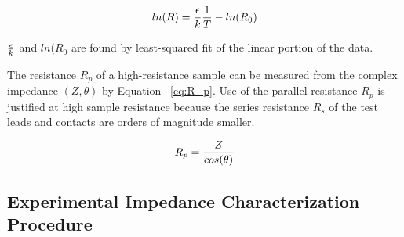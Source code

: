     \begin{equation}
        ln(R) = {\epsilon\over{k}} {1\over{T}} - ln(R_0)
        \label{eq:solve_emobility}
    \end{equation}
    
    ${\epsilon\over{k}}$ and $ln(R_0$ are found by least-squared fit of the linear portion of the data.
    
    The resistance $R_p$ of a high-resistance sample can be measured from the complex impedance $(Z,\theta)$ by Equation ~\ref{eq:R_p}.  Use of the parallel resistance $R_p$ is justified at high sample resistance because the series resistance $R_s$ of the test leads and contacts are orders of magnitude smaller.
    
    \begin{equation}
        R_p = {{Z} \over {cos({\theta})}}
        \label{eq:R_p}
    \end{equation}

    \subsection{Experimental Impedance Characterization Procedure}

